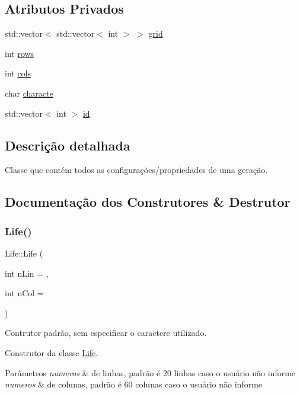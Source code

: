 \subsection*{Atributos Privados}
\begin{DoxyCompactItemize}
\item 
std\+::vector$<$ std\+::vector$<$ int $>$ $>$ \hyperlink{classLife_aeec163723c0c9aa1bc01483cd790210d}{grid}
\item 
int \hyperlink{classLife_ab4d1ea4344ba31a4686f388edb7e2927}{rows}
\item 
int \hyperlink{classLife_a31a428734f7dc76ca386963139699ac6}{cols}
\item 
char \hyperlink{classLife_aaf37ed012cf57294435f190da1bf4d1c}{characte}
\item 
std\+::vector$<$ int $>$ \hyperlink{classLife_ab33d6ee162673a71742a3df07a0a2e2f}{id}
\end{DoxyCompactItemize}


\subsection{Descrição detalhada}
Classe que contém todos as configurações/propriedades de uma geração. 

\subsection{Documentação dos Construtores \& Destrutor}
\mbox{\label{classLife_a9c54ff69842ec7e1f6195686abd48bfc}} 
\subsubsection{\texorpdfstring{Life()}{Life()}\hspace{0.1cm}{\footnotesize\ttfamily [1/2]}}
{\footnotesize\ttfamily Life\+::\+Life (\begin{DoxyParamCaption}\item[{int}]{n\+Lin = {},  }\item[{int}]{n\+Col = {} }\end{DoxyParamCaption})}



Contrutor padrão, sem especificar o caractere utilizado. 

Construtor da classe \hyperlink{classLife}{Life}. 
\begin{DoxyParams}{Parâmetros}
{\em numeros} & de linhas, padrão é 20 linhas caso o usuário não informe \\
\hline
{\em numeros} & de colunas, padrão é 60 colunas caso o usuário não informe \\
\hline
\end{DoxyParams}
\mbox{\label{classLife_ab1c77136658b414aed166fb5746dd7ef}} 
